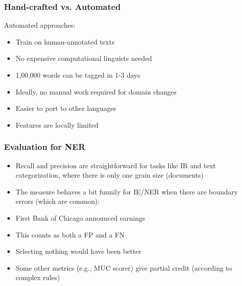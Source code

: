 \begin{frame}[fragile]\frametitle{Hand-crafted vs. Automated }
Automated approaches:
  \begin{itemize}
  \item Train on human-annotated texts
  \item No expensive computational linguists needed
  \item 1,00,000 words can be tagged in 1-3 days
  \item Ideally, no manual work required for domain changes
  \item Easier to port to other languages
  \item Features are locally limited
  \end{itemize}
\end{frame}

\begin{frame}[fragile]\frametitle{Evaluation for NER }
  \begin{itemize}
  \item Recall and precision are straightforward for tasks like IR and text 
categorization, where there is only one grain size (documents)
  \item The measure behaves a bit funnily for IE/NER when there are 
boundary errors (which are common):
  \item First Bank of Chicago announced earnings
  \item This counts as both a FP and a FN
  \item Selecting nothing would have been better
  \item Some other metrics (e.g., MUC scorer) give partial credit (according to complex rules)
  \end{itemize}
\end{frame}


